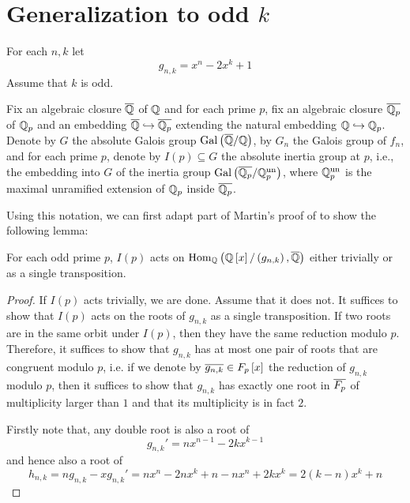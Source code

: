 \documentclass[../main.tex]{subfiles}
\begin{document}
\section{Generalization to odd $k$} 
For each $n,k$ let 
\[
  g_{n,k} = x^n - 2 x^k + 1
\]
Assume that $k$ is odd.

Fix an algebraic closure $\overline{\mathbb{Q}}$ of $\mathbb{Q}$ and for each prime $p$, fix an algebraic closure $\overline{\mathbb{Q}_p}$ of $\mathbb{Q}_p$ and an embedding $\overline{\mathbb{Q}} \hookrightarrow \overline{\mathbb{Q}_p}$ extending the natural embedding $\mathbb{Q} \hookrightarrow \mathbb{Q}_p$.
Denote by $G$ the absolute Galois group $\operatorname{Gal}\left( \overline{\mathbb{Q}}/\mathbb{Q} \right)$, by $G_n$ the Galois group of $f_n$, and for each prime $p$, denote by $I\left( p \right) \subseteq G$ the absolute inertia group at $p$, i.e., the embedding into $G$ of the inertia group $\operatorname{Gal}\left( \overline{\mathbb{Q}_p}/\mathbb{Q}_p^{\operatorname{un}} \right)$, where $\mathbb{Q}_p^{\operatorname{un}}$ is the maximal unramified extension of $\mathbb{Q}_p$ inside $\overline{\mathbb{Q}_p}$.

Using this notation, we can first adapt part of Martin's proof of \cite[Theorem 2.5]{MARTIN2004213} to show the following lemma:
\begin{lemma}
  \label{lem:inertia-acts-as-transposition}
  For each odd prime $p$, $I\left( p \right)$ acts on $\operatorname{\rm Hom}_{\mathbb{Q}}\left( \mathbb{Q}\left[ x \right] / \left( g_{n,k} \right), \overline{\mathbb{Q}} \right)$ either trivially or as a single transposition.
\end{lemma}
\begin{proof}
  If $I\left( p \right)$ acts trivially, we are done.
  Assume that it does not.
  It suffices to show that $I\left( p \right)$ acts on the roots of $g_{n,k}$ as a single transposition.
  If two roots are in the same orbit under $I\left( p \right)$, then they have the same reduction modulo $p$.
  Therefore, it suffices to show that $g_{n,k}$ has at most one pair of roots that are congruent modulo $p$, i.e. if we denote by $\overline{g_{n,k}} \in F_p\left[ x \right]$ the reduction of $g_{n,k}$ modulo $p$, then it suffices to show that $g_{n,k}$ has exactly one root in $\overline{F_p}$ of multiplicity larger than $1$ and that its multiplicity is in fact $2$.
  
  Firstly note that, any double root is also a root of 
  \[
    g_{n,k}' = n x^{n-1} - 2 k x^{k-1}
  \]
  and hence also a root of 
  \[
    h_{n,k} = n g_{n,k} - x g_{n,k}' = 
    nx^n - 2 n x^k + n - n x^n + 2 k x^k = 2 \left( k - n \right) x^k + n
  \]
  
\end{proof}
\end{document}
